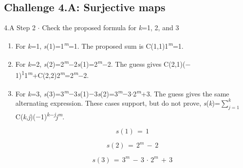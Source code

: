\documentclass[11pt]{article}
\begin{document}
\begin{keepsection}\subsection{Challenge 4.A: Surjective maps}

\begin{workedbox}{4.A Step 2 \ensuremath{\cdot} Check the proposed formula for \textit{k}=1, 2, and 3}
\begin{enumerate}
\item For \textit{k}=1, \textit{s}(1)=1\textsuperscript{\textit{m}}=1. The proposed sum is C(1,1)1\textsuperscript{\textit{m}}=1.
\item For \textit{k}=2, \textit{s}(2)=2\textsuperscript{\textit{m}}\ensuremath{-}2\textit{s}(1)=2\textsuperscript{\textit{m}}\ensuremath{-}2. The guess gives C(2,1)(\ensuremath{-}1)\textsuperscript{1}1\textsuperscript{\textit{m}}+C(2,2)2\textsuperscript{\textit{m}}=2\textsuperscript{\textit{m}}\ensuremath{-}2.
\item {}
For \textit{k}=3, \textit{s}(3)=3\textsuperscript{\textit{m}}\ensuremath{-}3\textit{s}(1)\ensuremath{-}3\textit{s}(2)=3\textsuperscript{\textit{m}}\ensuremath{-}3\ensuremath{\cdot}2\textsuperscript{\textit{m}}+3. The guess gives the same alternating expression. These cases support, but do not prove, \textit{s}(\textit{k})=$\sum_{{j}=1}^{{k}} $ C(\textit{k},\textit{j})(\ensuremath{-}1)\textsuperscript{\textit{k}\ensuremath{-}\textit{j}}\textit{j}\textsuperscript{\textit{m}}.

\begin{equation*}{s}(1)\, =\, 1\end{equation*}

\begin{equation*}{s}(2)\, =\, 2^{{m}}\, -\, 2\end{equation*}

\begin{equation*}{s}(3)\, =\, 3^{{m}}\, -\, 3\, \cdot \, 2^{{m}}\, +\, 3\end{equation*}
\end{enumerate}
\end{workedbox}

\end{keepsection}
\end{document}
